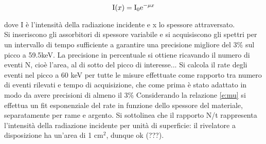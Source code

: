 \documentclass[twocolumn,10pt]{asme2ej}
\begin{document}
\vspace{-15pt}
\begin{equation}
   \text{I}(x) = \text{I}_0 \text{e}^{-\mu x}
    \vspace{-5pt}
    \label{e:mu}
\end{equation}

dove I è l'intensità della radiazione incidente e x lo spessore attraversato. 
\\ Si inseriscono gli assorbitori di spessore variabile e si acquisiscono gli spettri per
un intervallo di tempo sufficiente a garantire una precisione migliore del 3\% sul picco a 59.5keV.
La precisione in percentuale si ottiene ricavando il numero di eventi N, cioè l'area, al di sotto del
picco di interesse...
Si calcola il rate degli eventi nel picco a 60 keV per tutte le misure effettuate come rapporto tra numero di 
eventi rilevati e tempo di acquisizione, che come prima è stato adattato in modo da avere precisioni di almeno il 3\%
Considerando la relazione \autoref{e:mu} si effettua un fit esponenziale del rate in funzione dello spessore del materiale, 
separatamente per rame e argento. Si sottolinea che il rapporto N/t rappresenta l'intensità della radiazione incidente
per unità di superficie: il rivelatore a disposizione ha un'area di 1 $\si{\centi\metre}^2$, dunque ok (???).

\begin{table}[t]
    \centering
    \caption{Dati fit esponenziale per il calcolo del coefficiente di assorbimento}
    \label{t:assorbimento}
    \end{table}
\end{document}
